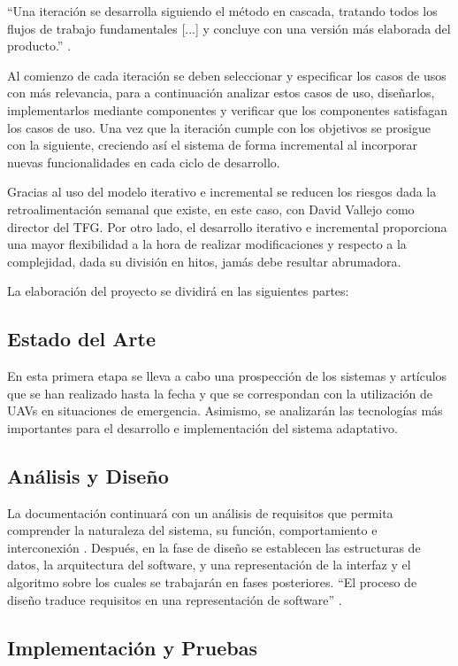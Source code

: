 \documentclass{pre-tfg}
\begin{document}
``Una iteración se desarrolla siguiendo el método en cascada, tratando todos los flujos de trabajo fundamentales [...] y concluye con una versión más elaborada del producto.'' \cite{ingsoftware}.

Al comienzo de cada iteración se deben seleccionar y especificar los casos de usos con más relevancia, para a continuación analizar estos casos de uso, diseñarlos, implementarlos mediante componentes y verificar que los componentes satisfagan los casos de uso. Una vez que la iteración cumple con los objetivos se prosigue con la siguiente, creciendo así el sistema de forma incremental al incorporar nuevas funcionalidades en cada ciclo de desarrollo.   

Gracias al uso del modelo iterativo e incremental se reducen los riesgos dada la retroalimentación semanal que existe, en este caso, con David Vallejo como director del TFG. Por otro lado, el desarrollo iterativo e incremental proporciona una mayor flexibilidad a la hora de realizar modificaciones y respecto a la complejidad, dada su división en hitos, jamás debe resultar abrumadora.

La elaboración del proyecto se dividirá en las siguientes partes:

\subsection{Estado del Arte}

En esta primera etapa se lleva a cabo una prospección de los sistemas y artículos que se han realizado hasta la fecha y que se correspondan con la utilización de UAVs en situaciones de emergencia. Asimismo, se analizarán  las tecnologías más importantes para el desarrollo e implementación del sistema adaptativo.

\subsection{Análisis y Diseño}

La documentación continuará con un análisis de requisitos que permita comprender la naturaleza del sistema, su función, comportamiento e interconexión \cite{pressman}. Después, en la fase de diseño se establecen las estructuras de datos, la arquitectura del software, y una representación de la interfaz y el algoritmo sobre los cuales se trabajarán en fases posteriores. ``El proceso de diseño traduce requisitos en una representación de software'' \cite{pressman}.

\subsection{Implementación y Pruebas}
\end{document}
